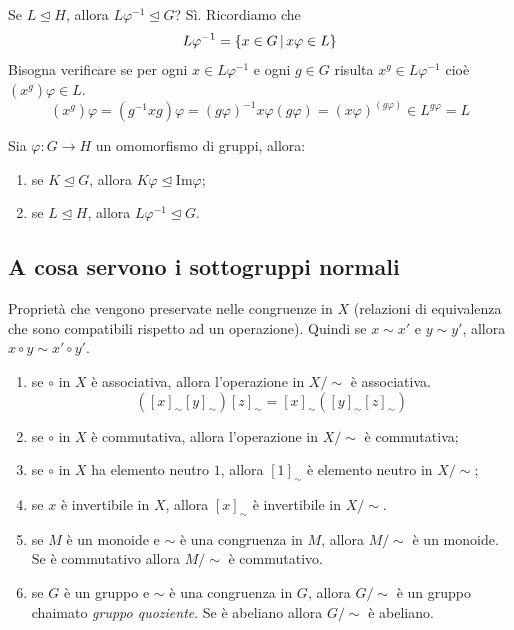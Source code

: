 \documentclass[a4paper]{article}
\begin{document}
Se \(L \unlhd H\), allora \(L\varphi^{-1} \unlhd G\)? Sì.
Ricordiamo che
\[
    L\varphi^{-1} = \{x \in G \,|\, x\varphi\in L \}
\]
Bisogna verificare se per ogni \(x \in L\varphi^{-1}\)
e ogni \(g\in G\) risulta \(x^g \in L \varphi^{-1}\) cioè \((x^g)\varphi \in L\).
\[
    (x^g) \varphi = (g^{-1} x g) \varphi = {(g\varphi)}^{-1} x \varphi(g\varphi)
    = {(x\varphi)}^{(g\varphi)} \in L^{g\varphi} = L
\]

\begin{snippetproposition}{}
    Sia \(\varphi \colon G \to H\) un omomorfismo di gruppi,
    allora:
    \begin{enumerate}
        \item se \(K \unlhd G\), allora \(K \varphi \unlhd \text{Im} \varphi\);
        \item se \(L \unlhd H\), allora \(L \varphi^{-1} \unlhd G\).
    \end{enumerate}
\end{snippetproposition}

\subsection{A cosa servono i sottogruppi normali}

Proprietà che vengono preservate nelle congruenze in \(X\) (relazioni di equivalenza che sono compatibili rispetto ad un operazione).
Quindi se \(x\sim x'\) e \(y \sim y'\), allora \(x\circ y \sim x'\circ y'\).

\begin{enumerate}
    \item se \(\circ\) in \(X\) è associativa, allora l'operazione in \(X / \sim\) è associativa.
    \[
        ({[x]}_\sim{[y]}_\sim){[z]}_\sim =  {[x]}_\sim({[y]}_\sim{[z]}_\sim) 
    \]
    \item se \(\circ\) in \(X\) è commutativa, allora l'operazione in \(X / \sim\) è commutativa;
    \item se \(\circ\) in \(X\) ha elemento neutro \(1\), allora \({[1]}_\sim\) è elemento neutro in \(X / \sim\);
    \item se \(x\) è invertibile in \(X\), allora \({[x]}_\sim\) è invertibile in \(X / \sim\).
    \item se \(M\) è un monoide e \(\sim\) è una congruenza in \(M\), allora \(M / \sim\) è un monoide.
        Se è commutativo allora \(M/\sim\) è commutativo.
    \item se \(G\) è un gruppo e \(\sim\) è una congruenza in \(G\), allora \(G / \sim\) è un gruppo chaimato \emph{gruppo quoziente}.
        Se è abeliano allora \(G/\sim\) è abeliano.
\end{enumerate}
\end{document}
